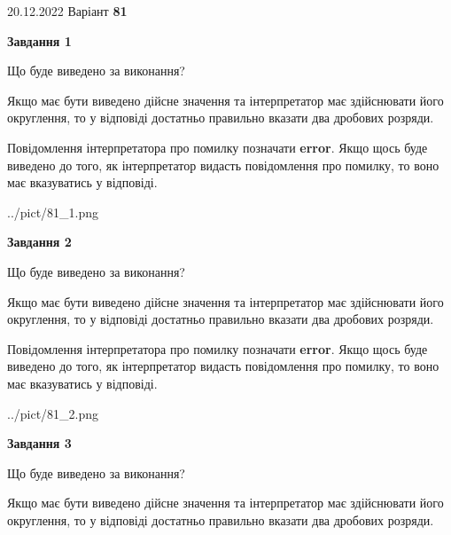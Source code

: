 \documentclass[12pt, ukrainian]{article}
\begin{document}
{20.12.2022 Варіант \No \textbf { 81 }\par}
{
\begin {Large}

{\begin {center}\textbf{Завдання 1}\end {center}}\par
Що буде виведено за виконання? \par

Якщо має бути виведено дійсне значення та інтерпретатор має здійснювати його округлення, 
то у відповіді достатньо правильно вказати два дробових розряди.

Повідомлення інтерпретатора про помилку позначати \textbf{error}.
Якщо щось буде виведено до того, як інтерпретатор видасть повідомлення про помилку, 
то воно має вказуватись у відповіді. \par

\begin{center}
	{../pict/81_1.png}
\end{center}
\newpage

{\begin {center}\textbf{Завдання 2}\end {center}}\par
Що буде виведено за виконання? \par

Якщо має бути виведено дійсне значення та інтерпретатор має здійснювати його округлення, 
то у відповіді достатньо правильно вказати два дробових розряди.

Повідомлення інтерпретатора про помилку позначати \textbf{error}.
Якщо щось буде виведено до того, як інтерпретатор видасть повідомлення про помилку, 
то воно має вказуватись у відповіді. \par

\begin{center}
	{../pict/81_2.png}
\end{center}
\newpage

{\begin {center}\textbf{Завдання 3}\end {center}}\par
Що буде виведено за виконання? \par

Якщо має бути виведено дійсне значення та інтерпретатор має здійснювати його округлення, 
то у відповіді достатньо правильно вказати два дробових розряди.


\end{Large}}
\end{document}
